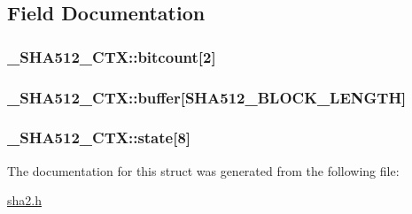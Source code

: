 \subsection{Field Documentation}
\hypertarget{struct__SHA512__CTX_a65507242047a042c46547894790a07ed}{
\subsubsection[{bitcount}]{ \-\_\-\-S\-H\-A512\-\_\-\-C\-T\-X\-::bitcount\mbox{[}2\mbox{]}}}\label{struct__SHA512__CTX_a65507242047a042c46547894790a07ed}
\hypertarget{struct__SHA512__CTX_af5939aad9b5e75338c05523479208e5f}{
\subsubsection[{buffer}]{ \-\_\-\-S\-H\-A512\-\_\-\-C\-T\-X\-::buffer\mbox{[}{\bf S\-H\-A512\-\_\-\-B\-L\-O\-C\-K\-\_\-\-L\-E\-N\-G\-T\-H}\mbox{]}}}\label{struct__SHA512__CTX_af5939aad9b5e75338c05523479208e5f}
\hypertarget{struct__SHA512__CTX_aa31ef0b0038ff139062dd31a17110043}{
\subsubsection[{state}]{ \-\_\-\-S\-H\-A512\-\_\-\-C\-T\-X\-::state\mbox{[}8\mbox{]}}}\label{struct__SHA512__CTX_aa31ef0b0038ff139062dd31a17110043}


The documentation for this struct was generated from the following file\-:\begin{DoxyCompactItemize}
\item 
\hyperlink{sha2_8h}{sha2.\-h}\end{DoxyCompactItemize}
